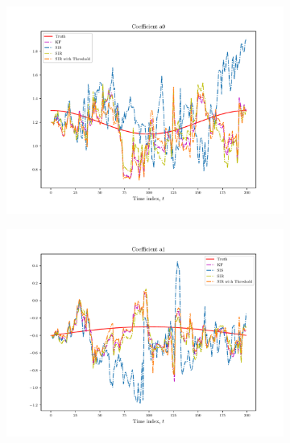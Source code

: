 \documentclass{article}
\begin{document}
\begin{figure}
    \begin{subfigure}{.5\textwidth}
        \includegraphics[width=\textwidth]{Figures/coefficient_a0.pdf}
    \end{subfigure}
    \begin{subfigure}{.5\textwidth}
        \includegraphics[width=\textwidth]{Figures/coefficient_a1.pdf}
    \end{subfigure}


\end{figure}
\end{document}
